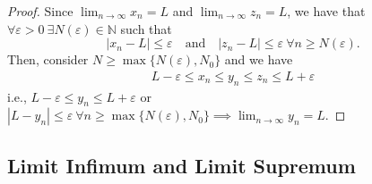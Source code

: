 \documentclass{article}
\newcommand{\N}{\mathbb{N}}
\newcommand{\mylim}[2]{\lim_{#1 \to #2}}
\newcommand{\?}{\stackrel{?}{=}}
\newcommand{\smallblacksquare}{\rule{0.5em}{0.5em}}
\theoremstyle{definition} %
\begin{document}
\begin{itemize}
\begin{theorem}
\begin{itemize}[label=\smallblacksquare]
    \end{itemize}
    \label{thm:squeeze}
    \end{theorem}
        \begin{proof}
            Since $\mylim{n}{\infty} x_n = L$ and $\mylim{n}{\infty} z_n = L$, we have that $\forall \varepsilon > 0 \ \exists N(\varepsilon) \in \N$ such that
            $$|x_n - L| \leq \varepsilon \quad \text{and} \quad |z_n - L| \leq \varepsilon \ \forall n \geq N(\varepsilon).$$
            Then, consider $N \geq \max\{N(\varepsilon), N_0\}$ and we have
            \begin{align*}
                L - \varepsilon \leq x_n \leq y_n \leq z_n \leq L + \varepsilon
            \end{align*}
            i.e., $L - \varepsilon \leq y_n \leq L + \varepsilon$ or $|L - y_n| \leq \varepsilon \ \forall n \geq \max\{N(\varepsilon), N_0\} \implies \mylim{n}{\infty} y_n = L$.
        \end{proof}
\end{itemize}

\subsection{Limit Infimum and Limit Supremum}
\end{document}
